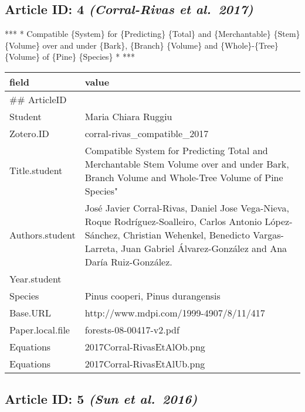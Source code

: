 \documentclass[]{article}
\begin{document}
\hypertarget{article-id-4-corral-rivas-et-al.2017}{%
\subsection{\texorpdfstring{Article ID: 4 \textbf{\emph{(Corral-Rivas et
al.~2017)}}}{Article ID: 4 (Corral-Rivas et al.~2017)}}\label{article-id-4-corral-rivas-et-al.2017}}

*** * Compatible \{System\} for \{Predicting\} \{Total\} and
\{Merchantable\} \{Stem\} \{Volume\} over and under \{Bark\}, \{Branch\}
\{Volume\} and \{Whole\}-\{Tree\} \{Volume\} of \{Pine\} \{Species\} *
***

\begin{table}[H]
\centering
\begin{tabular}{>{\raggedright\arraybackslash}p{2cm}>{\raggedright\arraybackslash}p{8cm}}
\toprule
field & value\\
\midrule
\#\# ArticleID & 4\\
Student & Maria Chiara Ruggiu\\
Zotero.ID & corral-rivas\_compatible\_2017\\
Title.student & Compatible System for Predicting Total and Merchantable Stem Volume over and under Bark, Branch Volume and Whole-Tree Volume of Pine Species"\\
Authors.student & José Javier Corral-Rivas, Daniel Jose Vega-Nieva, Roque Rodríguez-Soalleiro, Carlos Antonio López-Sánchez, Christian Wehenkel, Benedicto Vargas-Larreta, Juan Gabriel Álvarez-González and Ana Daría Ruiz-González.\\
\addlinespace
Year.student & 2017\\
Species & Pinus cooperi, Pinus durangensis\\
Base.URL & http://www.mdpi.com/1999-4907/8/11/417\\
Paper.local.file & forests-08-00417-v2.pdf\\
Equations & 2017Corral-RivasEtAlOb.png\\
Equations & 2017Corral-RivasEtAlUb.png\\
\bottomrule
\end{tabular}
\end{table}

\hypertarget{article-id-5-sun-et-al.2016}{%
\subsection{\texorpdfstring{Article ID: 5 \textbf{\emph{(Sun et
al.~2016)}}}{Article ID: 5 (Sun et al.~2016)}}\label{article-id-5-sun-et-al.2016}}
\end{document}
